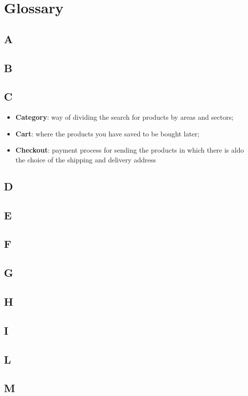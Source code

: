\newpage
\section{Glossary} \label{_glossario}
\subsection{A}
\subsection{B}
\subsection{C}
\begin{itemize} 
    \item \textbf{Category}: way of dividing the search for products by areas and sectors;
    \item \textbf{Cart}: where the products you have saved to be bought later;
    \item \textbf{Checkout}: payment process for sending the products in which there is aldo the choice of the shipping and delivery address
\end{itemize}
\subsection{D}
\subsection{E}
\subsection{F}
\subsection{G}
\subsection{H}
\subsection{I}
\subsection{L}
\subsection{M}
